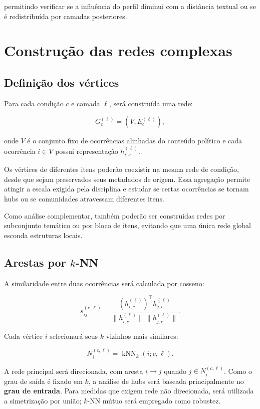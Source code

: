 \documentclass[11pt,a4paper]{article}
\begin{document}
permitindo verificar se a influência do perfil diminui com a distância textual ou se é redistribuída por camadas posteriores.

\section{Construção das redes complexas}

\subsection{Definição dos vértices}

Para cada condição $c$ e camada $\ell$, será construída uma rede:

\[
G_c^{(\ell)} = (V,E_c^{(\ell)}),
\]

onde $V$ é o conjunto fixo de ocorrências alinhadas do conteúdo político e cada ocorrência $i \in V$ possui representação $h_{i,c}^{(\ell)}$.

Os vértices de diferentes itens poderão coexistir na mesma rede de condição, desde que sejam preservados seus metadados de origem. Essa agregação permite atingir a escala exigida pela disciplina e estudar se certas ocorrências se tornam hubs ou se comunidades atravessam diferentes itens.

Como análise complementar, também poderão ser construídas redes por subconjunto temático ou por bloco de itens, evitando que uma única rede global esconda estruturas locais.

\subsection{Arestas por $k$-NN}

A similaridade entre duas ocorrências será calculada por cosseno:

\[
s_{ij}^{(c,\ell)}
=
\frac{
\left(h_{i,c}^{(\ell)}\right)^\top h_{j,c}^{(\ell)}
}{
\|h_{i,c}^{(\ell)}\|\,\|h_{j,c}^{(\ell)}\|
}.
\]

Cada vértice $i$ selecionará seus $k$ vizinhos mais similares:

\[
N_i^{(c,\ell)} = \operatorname{kNN}_k(i;c,\ell).
\]

A rede principal será direcionada, com aresta $i \rightarrow j$ quando $j \in N_i^{(c,\ell)}$. Como o grau de saída é fixado em $k$, a análise de hubs será baseada principalmente no \textbf{grau de entrada}. Para medidas que exigem rede não direcionada, será utilizada a simetrização por união; $k$-NN mútuo será empregado como robustez.
\end{document}
